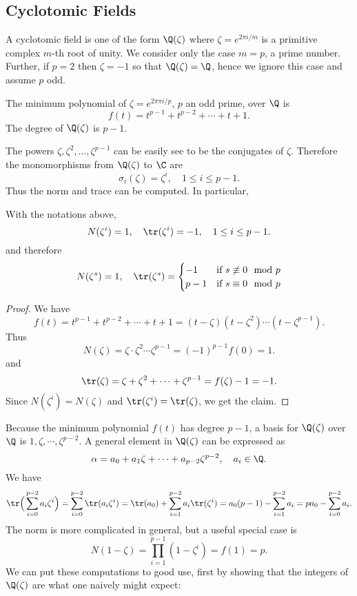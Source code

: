 \subsection{Cyclotomic Fields}
A cyclotomic field is one of the form $\Q(\zeta)$ where $\zeta=e^{2\pi i/m}$ is a primitive complex $m$-th root of unity. We consider only the case $m=p$, a prime number. Further, if $p=2$ then $\zeta=-1$ so that $\Q(\zeta)=\Q$, hence we ignore this case and assume $p$ odd.
\begin{lemma}
The minimum polynomial of $\zeta=e^{2π\pi i/p}$, $p$ an odd prime, over $\Q$ is
\[f(t)=t^{p-1}+t^{p-2}+\cdots+t+1.\]
The degree of $\Q(\zeta)$ is $p-1$.
\end{lemma}
The powers $\zeta,\zeta^2,\dots,\zeta^{p-1}$ can be easily see to be the conjugates of $\zeta$. Therefore the monomorphisms from $\Q(\zeta)$ to $\C$ are
\[\sigma_i(\zeta)=\zeta^i,\quad 1\leq i\leq p-1.\]
Thus the norm and trace can be computed. In particular,
\begin{proposition}
With the notations above,
\[N(\zeta^i)=1,\quad \tr(\zeta^i)=-1,\quad 1\leq i\leq p-1.\]
and therefore
\[N(\zeta^s)=1,\quad \tr(\zeta^s)=\begin{cases}
-1&\text{if }s\not\equiv 0\mod p\\
p-1&\text{if }s\equiv 0\mod p
\end{cases}\]
\end{proposition}
\begin{proof}
We have
\[f(t)=t^{p-1}+t^{p-2}+\cdots+t+1=(t-\zeta)(t-\zeta^2)\cdots(t-\zeta^{p-1}).\]
Thus
\[N(\zeta)=\zeta\cdot\zeta^2\cdots\zeta^{p-1}=(-1)^{p-1}f(0)=1.\]
and
\[\tr(\zeta)=\zeta+\zeta^2+\cdots+\zeta^{p-1}=f(\zeta)-1=-1.\]
Since $N(\zeta^i)=N(\zeta)$ and $\tr(\zeta^i)=\tr(\zeta)$, we get the claim.
\end{proof}
Because the minimum polynomial $f(t)$ has degree $p-1$, a basis for $\Q(\zeta)$ over $\Q$ is $1,\zeta,\cdots,\zeta^{p-2}$. A general element in $\Q(\zeta)$ can be expressed as
\[\alpha=a_0+a_1\zeta+\cdots+a_{p-2}\zeta^{p-2},\quad a_i\in\Q.\]
We have
\begin{align*}
\tr\Big(\sum_{i=0}^{p-2}a_i\zeta^i\Big)=\sum_{i=0}^{p-2}\tr(a_i\zeta^i)=\tr(a_0)+\sum_{i=1}^{p-2}a_i\tr(\zeta^i)=a_0(p-1)-\sum_{i=1}^{p-2}a_i=pa_0-\sum_{i=0}^{p-2}a_i.
\end{align*}
The norm is more complicated in general, but a useful special case is
\[N(1-\zeta)=\prod_{i=1}^{p-1}(1-\zeta^i)=f(1)=p.\]
We can put these computations to good use, first by showing that the integers of $\Q(\zeta)$ are what one naively might expect:
